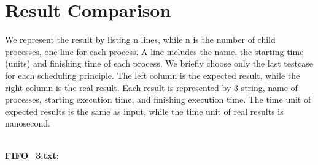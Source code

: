 \documentclass{article}
\begin{document}
\section{Result Comparison}

    We represent the result by listing n lines, while n is the number of child processes, one line for each process. A line includes the name, the starting time (units) and finishing time of each process. We briefly choose only the last testcase for each scheduling principle. The left column is the expected result, while the right column is the real result. Each result is represented by 3 string, name of processes, starting execution time, and finishing execution time. The time unit of expected results is the same as input, while the time unit of real results is nanosecond.\\\\
    
        \ttfamily

        {\noindent\bfseries FIFO\_3.txt:}
        \begin{parcolumns}[nofirstindent, colwidths={1=.2\linewidth}, rulebetween=true]{2}
        \end{parcolumns}
\end{document}
